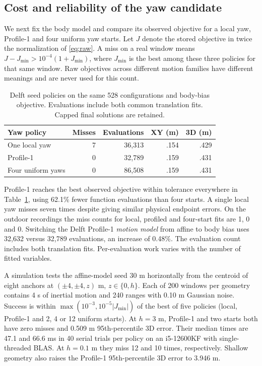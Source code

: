 \documentclass{IEEEtaes}
\begin{document}
\subsection{Cost and reliability of the yaw candidate}
We next fix the body model and compare its observed objective for a local yaw, Profile-1 and four uniform yaw starts. Let \(J\) denote the stored objective in twice the normalization of \eqref{eq:raw}. A miss on a real window means \(J-J_{\min}>10^{-4}(1+J_{\min})\), where \(J_{\min}\) is the best among these three policies for that same window. Raw objectives across different motion families have different meanings and are never used for this count.

\begin{table}[t]
\caption{Delft seed policies on the same 528 configurations and body-bias objective. Evaluations include both common translation fits. Capped final solutions are retained.}
\label{tab:seed}\centering\tablefont
\begin{tabular}{@{}lrrrr@{}}
\toprule
Yaw policy&Misses&Evaluations&XY (m)&3D (m)\\\midrule
One local yaw&7&36,313&.154&.429\\
Profile-1&0&32,789&.159&.431\\
Four uniform yaws&0&86,508&.159&.431\\\bottomrule
\end{tabular}
\end{table}

Profile-1 reaches the best observed objective within tolerance everywhere in Table~\ref{tab:seed}, using 62.1\% fewer function evaluations than four starts. A single local yaw misses seven times despite giving similar physical endpoint errors. On the outdoor recordings the miss counts for local, profiled and four-start fits are 1, 0 and 0. Switching the Delft Profile-1 \emph{motion model} from affine to body bias uses 32,632 versus 32,789 evaluations, an increase of 0.48\%. The evaluation count includes both translation fits. Per-evaluation work varies with the number of fitted variables.

A simulation tests the affine-model seed 30 m horizontally from the centroid of eight anchors at \((\pm4,\pm4,z)\) m, \(z\in\{0,h\}\). Each of 200 windows per geometry contains 4 s of inertial motion and 240 ranges with 0.10 m Gaussian noise. Success is within \(\max(10^{-3},10^{-5}|J_{\min}|)\) of the best of five policies (local, Profile-1 and 2, 4 or 12 uniform starts). At \(h=3\) m, Profile-1 and two starts both have zero misses and 0.509 m 95th-percentile 3D error. Their median times are 47.1 and 66.6 ms in 40 serial trials per policy on an i5-12600KF with single-threaded BLAS. At \(h=0.1\) m they miss 12 and 10 times, respectively. Shallow geometry also raises the Profile-1 95th-percentile 3D error to 3.946 m.
\end{document}
